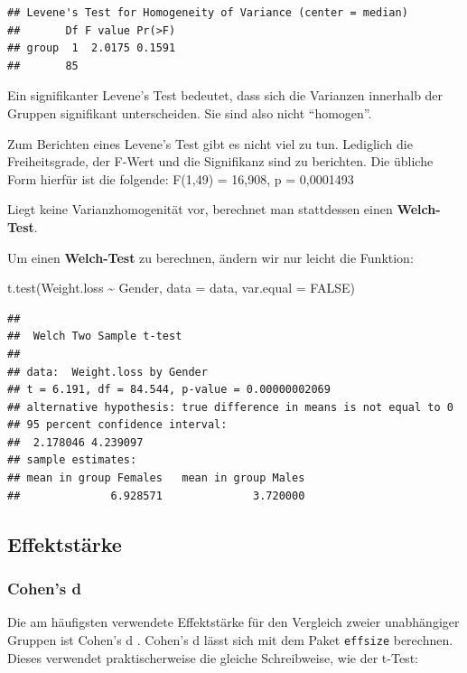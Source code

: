 \documentclass[
]{book}
\newenvironment{Shaded}{\begin{snugshade}}{\end{snugshade}}
\newcommand{\AttributeTok}[1]{\textcolor[rgb]{0.77,0.63,0.00}{#1}}
\newcommand{\ConstantTok}[1]{\textcolor[rgb]{0.00,0.00,0.00}{#1}}
\newcommand{\FunctionTok}[1]{\textcolor[rgb]{0.00,0.00,0.00}{#1}}
\newcommand{\NormalTok}[1]{#1}
\newcommand{\SpecialCharTok}[1]{\textcolor[rgb]{0.00,0.00,0.00}{#1}}
\begin{document}
\begin{verbatim}
## Levene's Test for Homogeneity of Variance (center = median)
##       Df F value Pr(>F)
## group  1  2.0175 0.1591
##       85
\end{verbatim}

Ein signifikanter Levene's Test bedeutet, dass sich die Varianzen innerhalb der Gruppen signifikant unterscheiden. Sie sind also nicht ``homogen''.

Zum Berichten eines Levene's Test gibt es nicht viel zu tun. Lediglich die Freiheitsgrade, der F-Wert und die Signifikanz sind zu berichten. Die übliche Form hierfür ist die folgende: F(1,49) = 16,908, p = 0,0001493

Liegt keine Varianzhomogenität vor, berechnet man stattdessen einen \textbf{Welch-Test}.

Um einen \textbf{Welch-Test} zu berechnen, ändern wir nur leicht die Funktion:

\begin{Shaded}
\begin{Highlighting}[]
\FunctionTok{t.test}\NormalTok{(Weight.loss }\SpecialCharTok{\textasciitilde{}}\NormalTok{ Gender, }\AttributeTok{data =}\NormalTok{ data, }\AttributeTok{var.equal =} \ConstantTok{FALSE}\NormalTok{)}
\end{Highlighting}
\end{Shaded}

\begin{verbatim}
## 
##  Welch Two Sample t-test
## 
## data:  Weight.loss by Gender
## t = 6.191, df = 84.544, p-value = 0.00000002069
## alternative hypothesis: true difference in means is not equal to 0
## 95 percent confidence interval:
##  2.178046 4.239097
## sample estimates:
## mean in group Females   mean in group Males 
##              6.928571              3.720000
\end{verbatim}

\hypertarget{effektstuxe4rke-1}{%
\subsection{Effektstärke}\label{effektstuxe4rke-1}}

\hypertarget{cohens-d-1}{%
\subsubsection{Cohen's d}\label{cohens-d-1}}

Die am häufigsten verwendete Effektstärke für den Vergleich zweier unabhängiger Gruppen ist Cohen's d \citet{cohen1988statistical}.
Cohen's d lässt sich mit dem Paket \texttt{effsize} berechnen. Dieses verwendet praktischerweise die gleiche Schreibweise, wie der t-Test:
\end{document}

